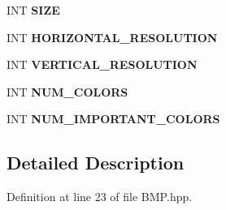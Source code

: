 \begin{DoxyCompactItemize}
\item 
I\+NT {\bfseries S\+I\+ZE}\hypertarget{struct_b_i_t_m_a_p___i_n_f_o_r_m_a_t_i_o_n___h_e_a_d_e_r_a6d728081de4ad2b38a7a9bf723f3078c}{}\label{struct_b_i_t_m_a_p___i_n_f_o_r_m_a_t_i_o_n___h_e_a_d_e_r_a6d728081de4ad2b38a7a9bf723f3078c}

\item 
I\+NT {\bfseries H\+O\+R\+I\+Z\+O\+N\+T\+A\+L\+\_\+\+R\+E\+S\+O\+L\+U\+T\+I\+ON}\hypertarget{struct_b_i_t_m_a_p___i_n_f_o_r_m_a_t_i_o_n___h_e_a_d_e_r_a1ea6aa22d546339fa03731bd56d7bb1b}{}\label{struct_b_i_t_m_a_p___i_n_f_o_r_m_a_t_i_o_n___h_e_a_d_e_r_a1ea6aa22d546339fa03731bd56d7bb1b}

\item 
I\+NT {\bfseries V\+E\+R\+T\+I\+C\+A\+L\+\_\+\+R\+E\+S\+O\+L\+U\+T\+I\+ON}\hypertarget{struct_b_i_t_m_a_p___i_n_f_o_r_m_a_t_i_o_n___h_e_a_d_e_r_a50812bcda652fe8377b85b1e9779d507}{}\label{struct_b_i_t_m_a_p___i_n_f_o_r_m_a_t_i_o_n___h_e_a_d_e_r_a50812bcda652fe8377b85b1e9779d507}

\item 
I\+NT {\bfseries N\+U\+M\+\_\+\+C\+O\+L\+O\+RS}\hypertarget{struct_b_i_t_m_a_p___i_n_f_o_r_m_a_t_i_o_n___h_e_a_d_e_r_a3badf5ea06bb1d9e0d423a6fd35d2357}{}\label{struct_b_i_t_m_a_p___i_n_f_o_r_m_a_t_i_o_n___h_e_a_d_e_r_a3badf5ea06bb1d9e0d423a6fd35d2357}

\item 
I\+NT {\bfseries N\+U\+M\+\_\+\+I\+M\+P\+O\+R\+T\+A\+N\+T\+\_\+\+C\+O\+L\+O\+RS}\hypertarget{struct_b_i_t_m_a_p___i_n_f_o_r_m_a_t_i_o_n___h_e_a_d_e_r_aa1cd6991598b67ada844d78b697337d5}{}\label{struct_b_i_t_m_a_p___i_n_f_o_r_m_a_t_i_o_n___h_e_a_d_e_r_aa1cd6991598b67ada844d78b697337d5}

\end{DoxyCompactItemize}


\subsection{Detailed Description}


Definition at line 23 of file B\+M\+P.\+hpp.

